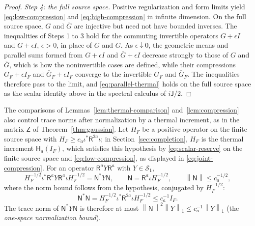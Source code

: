 \documentclass[11pt]{amsart}
\numberwithin{equation}{section}
\theoremstyle{definition}
\newcommand{\Sc}{\mathcal S}
\newcommand{\Res}{\mathsf R}
\newcommand{\Therm}{\mathsf H}
\newcommand{\norm}[1]{\left\|#1\right\|}
\begin{document}
\begin{proof}
\smallskip
\emph{Step 4: the full source space.} Positive regularization and form
limits yield \eqref{eq:low-compression} and \eqref{eq:high-compression}
in infinite dimension. On the full source
space, \(G\) and \(\overline G\) are injective but need not have
bounded inverses. The inequalities of Steps 1 to 3 hold for the
commuting invertible operators \(G+\epsilon I\) and
\(\overline G+\epsilon I\), \(\epsilon>0\), in place of \(G\) and
\(\overline G\). As \(\epsilon\downarrow0\), the geometric means and
parallel sums formed from \(G+\epsilon I\) and \(\overline G+\epsilon I\)
decrease strongly to those of \(G\) and
\(\overline G\), which is how the noninvertible cases are defined,
while their compressions \(G_F+\epsilon I_F\) and
\(\overline G_F+\epsilon I_F\) converge to the invertible \(G_F\) and
\(\overline G_F\). The inequalities therefore pass to the limit, and
\eqref{eq:parallel-thermal} holds on the full source space as the
scalar identity above in the spectral calculus of \(i\mathsf J/2\).
\end{proof}

The comparisons of Lemmas~\ref{lem:thermal-comparison}
and~\ref{lem:compression} also control trace norms after normalization
by a thermal increment, as in the matrix \(\mathsf Z\) of
Theorem~\ref{thm:gaussian}.
Let \(H_F\) be a positive operator on the finite source space with
\(H_F\ge c_a\iota^*\Res^{2a}\iota\); in
Section~\ref{sec:completion}, \(H_F\) is the thermal increment
\(\Therm_a(I_F)\), which satisfies this hypothesis by
\eqref{eq:scalar-reserve} on the finite source space and
\eqref{eq:low-compression}, as displayed in
\eqref{eq:joint-compression}. For an operator \(\Res^aY\Res^a\) with
\(Y\in\Sc_1\),
\[
 H_F^{-1/2}\iota^*\Res^aY\Res^a\iota H_F^{-1/2}
 =\mathsf N^*Y\mathsf N,\qquad
 \mathsf N=\Res^a\iota H_F^{-1/2},\qquad
 \norm{\mathsf N}\le c_a^{-1/2},
\]
where the norm bound follows from the hypothesis, conjugated by
\(H_F^{-1/2}\):
\[
 \mathsf N^*\mathsf N
 =H_F^{-1/2}\iota^*\Res^{2a}\iota H_F^{-1/2}
 \le c_a^{-1}I_F.
\]
The trace norm of \(\mathsf N^*Y\mathsf N\) is therefore at most
\(\norm{\mathsf N}^2\norm{Y}_1\le c_a^{-1}\norm{Y}_1\) (the
\emph{one-space normalization bound}).
\end{document}
